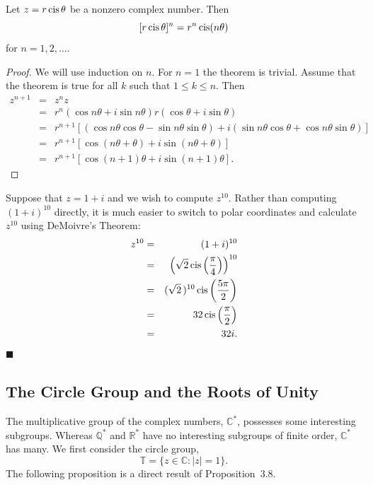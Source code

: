  
\begin{theorem}[DeMoivre]
Let $z = r \operatorname{cis}  \theta$ be a nonzero complex number. Then 
$$
[r \operatorname{cis} \theta  ]^n
=
r^n \operatorname{cis}( n \theta)
$$
for $n = 1, 2, \ldots$.
\end{theorem}
 
 
\begin{proof}
We will use induction on $n$. For $n = 1$ the theorem is trivial.
Assume that the theorem is true for all $k$ such that $1  \leq k \leq
n$. Then 
\begin{eqnarray*}
z^{n+1} & = & z^n z \\
& = &
r^n( \cos  n \theta + i \sin n \theta ) r( \cos \theta + i
\sin \theta ) \\
& = &
r^{n+1} [( \cos n \theta \cos \theta - \sin n \theta \sin
\theta )
 + i ( \sin n \theta \cos \theta + \cos n \theta \sin \theta
)] \\
& = &
r^{n+1} [ \cos( n \theta + \theta) + i \sin( n \theta +
\theta) ] \\
& = &
r^{n+1} [ \cos( n +1) \theta + i \sin( n+1) \theta  ].
\end{eqnarray*}
\end{proof}
 
 
\vspace{2ex}
 
 
Suppose that $z= 1+i$ and we wish to compute $z^{10}$. Rather than
computing $(1+i)^{10}$ directly, it is much easier to switch to polar
coordinates and calculate $z^{10}$ using DeMoivre's Theorem:
\begin{eqnarray*}
z^{10}
& = &
(1+i)^{10} \\
& = &
\left( \sqrt{2} \operatorname{cis} \left( \frac{\pi }{4} \right)
\right)^{10} \\
& = &
( \sqrt{2}\, )^{10} \operatorname{cis} \left( \frac{5\pi }{2} \right)
\\
& = &
32  \operatorname{cis} \left( \frac{\pi }{2} \right) \\
& = & 32i.
\end{eqnarray*}
\hspace{\fill} $\blacksquare$
 
 
\subsection*{The Circle Group and the Roots of Unity }
 
 
The multiplicative group of the complex numbers, ${\mathbb C}^*$,
possesses some interesting subgroups.  Whereas ${\mathbb Q}^*$ and ${\mathbb
R}^*$ have no interesting subgroups of finite order, ${\mathbb C}^*$ has 
many. We first consider the {\bfi circle group}, 
$$
{\mathbb T}\label{notecirclegroup} = \{ z \in {\mathbb C} : |z| = 1 \}.
$$
The following proposition is a direct result of Proposition~3.8.
 
